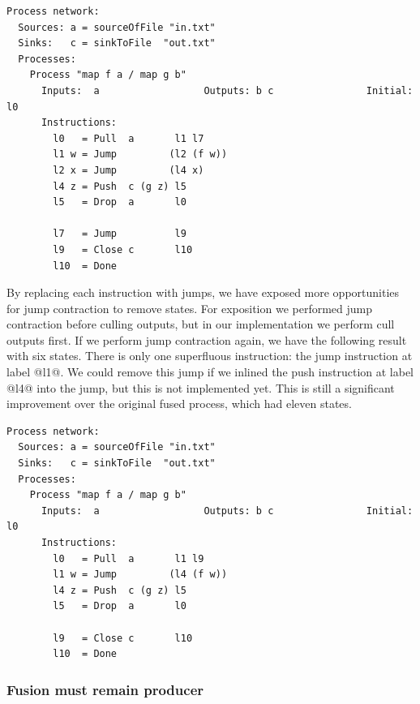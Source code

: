 \begin{lstlisting}[linebackgroundcolor={
  \hilineFst{8}
  \hilineCom{9}
  \hilineFst{10}
  \hilineSnd{11}
  \hilineFst{12}
  \hilineFst{14}
  \hilineSnd{15}
  \hilineCom{16}
}]
Process network:
  Sources: a = sourceOfFile "in.txt"
  Sinks:   c = sinkToFile  "out.txt"
  Processes:
    Process "map f a / map g b"
      Inputs:  a                  Outputs: b c                Initial: l0
      Instructions:
        l0   = Pull  a       l1 l7
        l1 w = Jump         (l2 (f w))
        l2 x = Jump         (l4 x)
        l4 z = Push  c (g z) l5
        l5   = Drop  a       l0

        l7   = Jump          l9
        l9   = Close c       l10
        l10  = Done
\end{lstlisting}

By replacing each instruction with jumps, we have exposed more opportunities for jump contraction to remove states.
For exposition we performed jump contraction before culling outputs, but in our implementation we perform cull outputs first.
If we perform jump contraction again, we have the following result with six states.
There is only one superfluous instruction: the jump instruction at label @l1@.
We could remove this jump if we inlined the push instruction at label @l4@ into the jump, but this is not implemented yet.
This is still a significant improvement over the original fused process, which had eleven states.

\begin{lstlisting}[linebackgroundcolor={
  \hilineFst{8}
  \hilineCom{9}
  \hilineFst{10}
  \hilineFst{11}
  \hilineSnd{13}
  \hilineCom{14}
}]
Process network:
  Sources: a = sourceOfFile "in.txt"
  Sinks:   c = sinkToFile  "out.txt"
  Processes:
    Process "map f a / map g b"
      Inputs:  a                  Outputs: b c                Initial: l0
      Instructions:
        l0   = Pull  a       l1 l9
        l1 w = Jump         (l4 (f w))
        l4 z = Push  c (g z) l5
        l5   = Drop  a       l0

        l9   = Close c       l10
        l10  = Done
\end{lstlisting}

\subsubsection{Fusion must remain producer}

